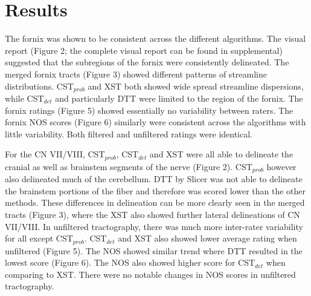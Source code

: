 
\section{Results}

The fornix was shown to be consistent across the different algorithms. The visual report (Figure 2; the complete visual report can be found in supplemental) suggested that the subregions of the fornix were consistently delineated. The merged fornix tracts (Figure 3) showed different patterns of streamline distributions. CST$_{prob}$ and XST both showed wide spread streamline dispersions, while CST$_{det}$ and particularly DTT were limited to the region of the fornix. The fornix ratings (Figure 5) showed essentially no variability between raters.  The fornix NOS scores (Figure 6) similarly were consistent across the algorithms with little variability. Both filtered and unfiltered ratings were identical. 

For the CN VII/VIII, CST$_{prob}$, CST$_{det}$ and XST were all able to delineate the cranial as well as brainstem segments of the nerve (Figure 2). CST$_{prob}$ however also delineated much of the cerebellum. DTT by Slicer was not able to delineate the brainstem portions of the fiber and therefore was scored lower than the other methods. These differences in delineation can be more clearly seen in the merged tracts (Figure 3), where the XST also showed further lateral delineations of CN VII/VIII. In unfiltered tractography, there was much more inter-rater variability for all except CST$_{prob}$. CST$_{det}$ and XST also showed lower average rating when unfiltered (Figure 5). The NOS showed similar trend where DTT resulted in the lowest score (Figure 6). The NOS also showed higher score for CST$_{det}$ when comparing to XST. There were no notable changes in NOS scores in unfiltered tractography. 

